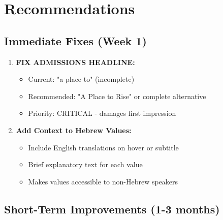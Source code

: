 \documentclass[12pt,letterpaper]{article}
\begin{document}
\section{Recommendations}

\subsection{Immediate Fixes (Week 1)}

\begin{enumerate}[leftmargin=*]
    \item \textbf{FIX ADMISSIONS HEADLINE:}
    \begin{itemize}
        \item Current: "a place to" (incomplete)
        \item Recommended: "A Place to Rise" or complete alternative
        \item Priority: CRITICAL - damages first impression
    \end{itemize}

    \item \textbf{Add Context to Hebrew Values:}
    \begin{itemize}
        \item Include English translations on hover or subtitle
        \item Brief explanatory text for each value
        \item Makes values accessible to non-Hebrew speakers
    \end{itemize}
\end{enumerate}

\subsection{Short-Term Improvements (1-3 months)}
\end{document}
